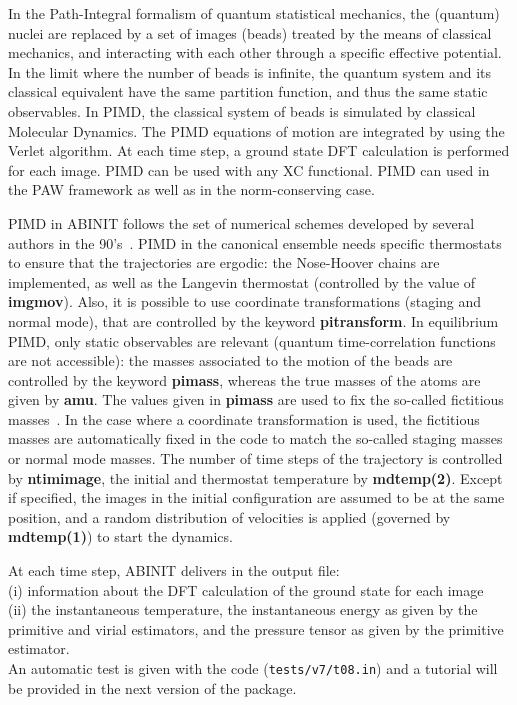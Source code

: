 \documentclass{elsart}
\begin{document}
In the Path-Integral formalism of quantum statistical mechanics, the (quantum) nuclei are replaced by a set of images (beads) treated by the means of classical mechanics, and interacting with each other through a specific effective potential. In the limit where the number of beads is infinite, the quantum system and its classical equivalent have the same partition function, and thus the same static observables. In PIMD, the classical system of beads is simulated by classical Molecular Dynamics. The PIMD equations of motion are integrated by using the Verlet algorithm.
At each time step, a ground state DFT calculation is performed for each image.
PIMD can be used with any XC functional. 
PIMD can used in the PAW framework as well as in the norm-conserving case.


PIMD in ABINIT follows the set of numerical schemes developed by several authors in the 90's~\cite{Marx96,Tuckerman96}. 
PIMD in the canonical ensemble needs specific thermostats to ensure that the trajectories are ergodic:
the Nose-Hoover chains are implemented, as well as the Langevin thermostat (controlled by the value of {\bf imgmov}).
Also, it is possible to use coordinate transformations (staging and normal mode), that are controlled by the keyword {\bf pitransform}.
In equilibrium PIMD, only static observables are relevant (quantum time-correlation functions are not accessible): the
masses associated to the motion of the beads are controlled by the keyword {\bf pimass}, whereas the true masses of the atoms
are given by {\bf amu}. The values given in {\bf pimass} are used to fix the so-called fictitious masses~\cite{Marx96}. In the case
where a coordinate transformation is used, the fictitious masses are automatically fixed in the code to match the so-called
staging masses or normal mode masses. 
The number of time steps of the trajectory is controlled by {\bf ntimimage}, the initial and thermostat temperature by {\bf mdtemp(2)}.
Except if specified, the images in the initial configuration are assumed to be at the same position, and a random distribution
of velocities is applied (governed by {\bf mdtemp(1)}) to start the dynamics.


At each time step, ABINIT delivers in the output file: \\
(i) information about the DFT calculation of the ground state for each image \\
(ii) the instantaneous temperature, the instantaneous energy as given by 
the primitive and virial estimators, and the pressure tensor as given by the primitive estimator.\\
An automatic test is given with the code ({\tt tests/v7/t08.in}) and a tutorial will be provided in the next version of the package.
\end{document}
